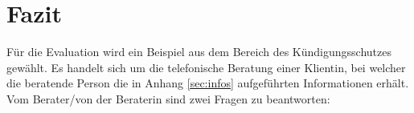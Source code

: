 ﻿\section{Fazit}
Für die Evaluation wird ein Beispiel aus dem Bereich des Kündigungsschutzes gewählt. Es handelt sich um die telefonische Beratung einer Klientin, bei welcher die beratende Person die in Anhang \ref{sec:infos} aufgeführten Informationen erhält. Vom Berater/von der Beraterin sind zwei Fragen zu beantworten: